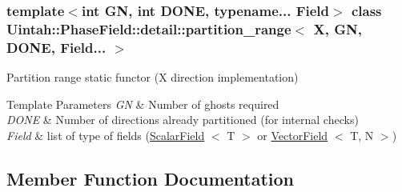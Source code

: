 \subsubsection*{template$<$int GN, int D\+O\+NE, typename... Field$>$\newline
class Uintah\+::\+Phase\+Field\+::detail\+::partition\+\_\+range$<$ X, G\+N, D\+O\+N\+E, Field... $>$}

Partition range static functor (X direction implementation) 


\begin{DoxyTemplParams}{Template Parameters}
{\em GN} & Number of ghosts required \\
\hline
{\em D\+O\+NE} & Number of directions already partitioned (for internal checks) \\
\hline
{\em Field} & list of type of fields (\hyperlink{structUintah_1_1PhaseField_1_1ScalarField}{Scalar\+Field} $<$ T $>$ or \hyperlink{structUintah_1_1PhaseField_1_1VectorField}{Vector\+Field} $<$ T, N $>$) \\
\hline
\end{DoxyTemplParams}


\subsection{Member Function Documentation}
\mbox{\label{classUintah_1_1PhaseField_1_1detail_1_1partition__range_3_01X_00_01GN_00_01DONE_00_01Field_8_8_8_01_4_aa1e61750c34c2eb589915e421320130b}} 

